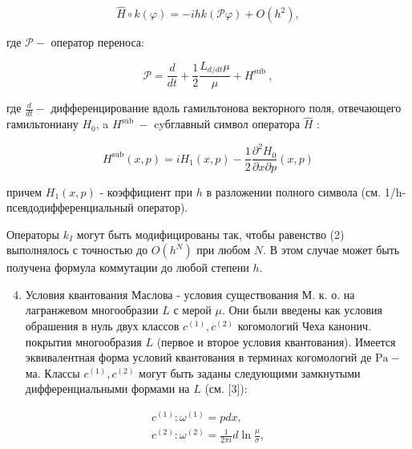 \documentclass[10pt]{article}
\begin{document}
\[

\hat{H} \circ k(\varphi)=-i h k(\mathscr{P} \varphi)+O\left(h^{2}\right),

\]



где $\mathscr{P}-$ оператор переноса:



\[

\mathscr{P}=\frac{d}{d t}+\frac{1}{2} \frac{L_{d / d t} \mu}{\mu}+H^{\text {sub }},

\]



где $\frac{d}{d t}-$ дифференцирование вдоль гамильтонова векторного поля, отвечающего гамильтониану $H_{0}$, a $H^{\text {sub }}-$ cyбглавный символ оператора $\hat{H}$ :



\[

H^{\mathrm{sub}}(x, p)=i H_{1}(x, p)-\frac{1}{2} \frac{\partial^{2} H_{0}}{\partial x \partial p}(x, p)

\]



причем $H_{1}(x, p)$ - коэффициент при $h$ в разложении полного символа (см. 1/h-псевдодифференциальный оператор).



Операторы $k_{I}$ могут быть модифицированы так, чтобы равенство (2) выполнялось с точностью до $O\left(h^{N}\right)$ при любом $N$. В этом случае может быть получена формула коммутации до любой степени $h$.



\begin{enumerate}

  \setcounter{enumi}{3}

  \item Условия квантования Маслова - условия существования М. к. о. на лагранжевом многообразии $L$ с мерой $\mu$. Они были введены как условия обрашения в нуль двух классов $c^{(1)}, c^{(2)}$ когомологий Чеха канонич. покрытия многообразия $L$ (первое и второе условия квантования). Имеется эквивалентная форма условий квантования в терминах когомологий де $\mathrm{Pa}-$ ма. Классы $c^{(1)}, c^{(2)}$ могут быть заданы следующими замкнутыми дифференциальными формами на $L$ (см. [3]):

\end{enumerate}



\[

\begin{gathered}

c^{(1)}: \omega^{(1)}=p d x, \\

c^{(2)}: \omega^{(2)}=\frac{1}{2 \pi i} d \ln \frac{\mu}{\sigma},

\end{gathered}

\]
\end{document}
